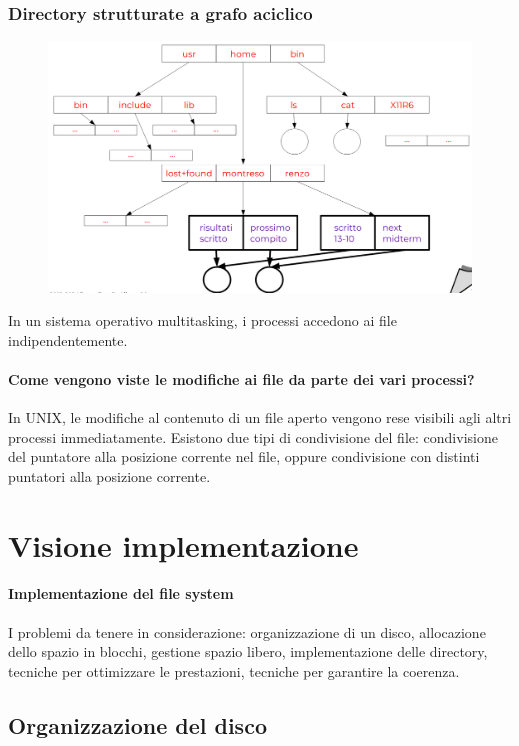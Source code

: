 \subsubsection{Directory strutturate a grafo aciclico}
\begin{figure} [h]
    \centering
    \includegraphics[width=0.7\linewidth]{Images/Screenshot 2025-01-18 at 16-04-34 so-07-filesystem.pdf.png}
\end{figure}

In un sistema operativo multitasking, i processi accedono ai
file indipendentemente.

\paragraph{Come vengono viste le modifiche ai file da parte dei vari processi?}
In UNIX, le modifiche al contenuto di un file aperto vengono rese visibili agli altri processi immediatamente. Esistono due tipi di condivisione del file: condivisione del puntatore alla posizione corrente nel file, oppure condivisione con distinti puntatori alla posizione corrente.


\section{Visione implementazione}


\paragraph{Implementazione del file system}

I problemi da tenere in considerazione: 
organizzazione di un disco, allocazione dello spazio in blocchi, gestione spazio libero, implementazione delle directory, tecniche per ottimizzare le prestazioni, tecniche per garantire la coerenza.

\subsection{Organizzazione del disco}
